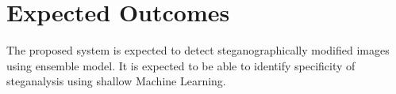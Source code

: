 \chapter{Expected Outcomes}
The proposed system is expected to detect steganographically modified images using ensemble model. It is expected to be able to identify specificity of steganalysis using shallow Machine Learning.




